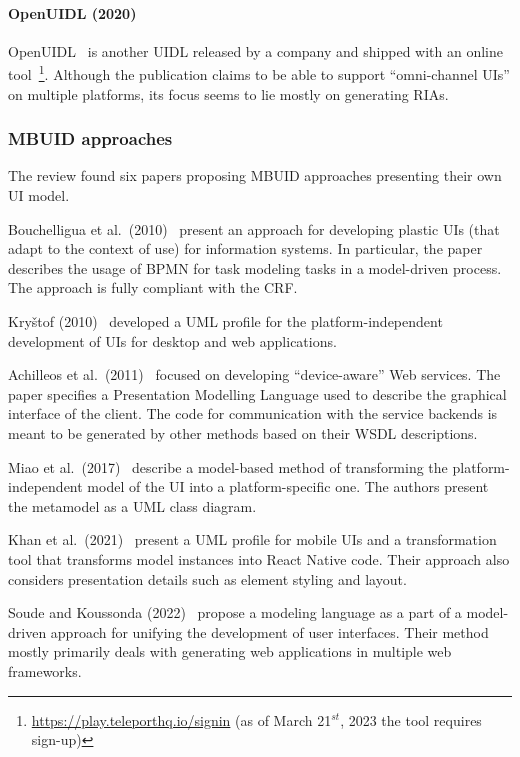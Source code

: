 \paragraph{OpenUIDL (2020)}
OpenUIDL~\cite{Moldovan2020} is another UIDL released by a company and shipped with an online tool~\footnote{\url{https://play.teleporthq.io/signin} (as of March 21$^{st}$, 2023 the tool requires sign-up)}.
Although the publication claims to be able to support \enquote{omni-channel UIs} on multiple platforms, its focus seems to lie mostly on generating RIAs.

\subsubsection{MBUID approaches}

The review found six papers proposing MBUID approaches presenting their own UI model.

Bouchelligua et al.\ (2010)~\cite{Bouchelligua2010} present an approach for developing plastic UIs (that adapt to the context of use) for information systems.
In particular, the paper describes the usage of BPMN for task modeling tasks in a model-driven process.
The approach is fully compliant with the CRF\@.

Kryštof (2010)~\cite{kryvstof2010lpgm} developed a UML profile for the platform-independent development of UIs for desktop and web applications.

Achilleos et al.\ (2011)~\cite{Achilleos2011} focused on developing \enquote{device-aware} Web services.
The paper specifies a Presentation Modelling Language used to describe the graphical interface of the client.
The code for communication with the service backends is meant to be generated by other methods based on their WSDL descriptions.

Miao et al.\ (2017)~\cite{Miao2017} describe a model-based method of transforming the platform-independent model of the UI into a platform-specific one.
The authors present the metamodel as a UML class diagram.

Khan et al.\ (2021)~\cite{Khan2021} present a UML profile for mobile UIs and a transformation tool that transforms model instances into React Native code.
Their approach also considers presentation details such as element styling and layout.

Soude and Koussonda (2022)~\cite{Soude2022} propose a modeling language as a part of a model-driven approach for unifying the development of user interfaces.
Their method mostly primarily deals with generating web applications in multiple web frameworks.

